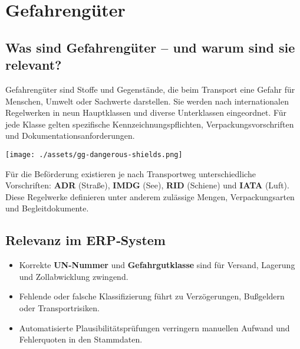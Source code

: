 \section{Gefahrengüter}
\subsection{Was sind Gefahrengüter – und warum sind sie relevant?}

Gefahrengüter sind Stoffe und Gegenstände, die beim Transport eine
Gefahr für Menschen, Umwelt oder Sachwerte darstellen. Sie werden nach
internationalen Regelwerken in neun Hauptklassen und diverse Unterklassen
eingeordnet. Für jede Klasse gelten spezifische Kennzeichnungspflichten,
Verpackungsvorschriften und Dokumentationsanforderungen.

\begin{center}
  \texttt{[image: ./assets/gg-dangerous-shields.png]}
\end{center}

Für die Beförderung existieren je nach Transportweg unterschiedliche Vorschriften:
\textbf{ADR} (Straße), \textbf{IMDG} (See), \textbf{RID} (Schiene) und \textbf{IATA} (Luft).
Diese Regelwerke definieren unter anderem zulässige Mengen, Verpackungsarten und
Begleitdokumente.

\subsection{Relevanz im ERP‐System}
\begin{itemize}
  \item Korrekte \textbf{UN-Nummer} und \textbf{Gefahrgutklasse} sind für
        Versand, Lagerung und Zollabwicklung zwingend.
  \item Fehlende oder falsche Klassifizierung führt zu
        Verzögerungen, Bußgeldern oder Transportrisiken.
  \item Automatisierte Plausibilitätsprüfungen verringern manuellen
        Aufwand und Fehlerquoten in den Stammdaten.
\end{itemize}